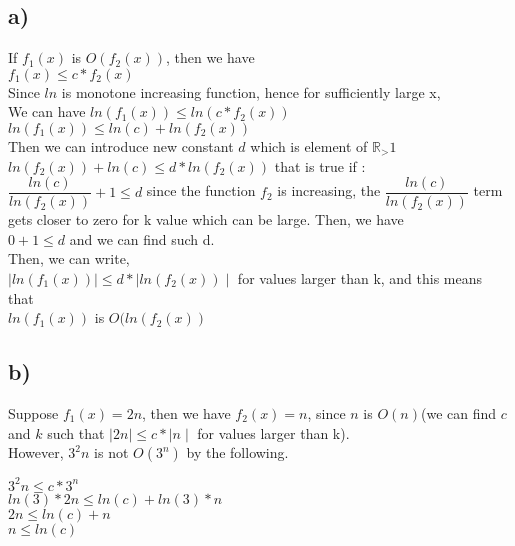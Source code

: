 \documentclass[12pt]{article}
\begin{document}
\subsection*{a)}

If $f_1(x)$ is $O(f_2(x))$, then we have \\
$f_1(x) \leq c * f_2(x)$ \\

Since $ln$ is monotone increasing function, hence for sufficiently large x, \\

We can have $ln(f_1(x)) \leq ln(c*f_2(x))$ \\

$ln(f_1(x)) \leq ln(c) + ln(f_2(x))$ \\

Then we can introduce new constant $d$ which is element of $\mathbb{R}_>1$ \\

$ln(f_2(x)) + ln(c) \leq d*ln(f_2(x))$ that is true if : \\

$\dfrac{ln(c)}{ln(f_2(x))} + 1 \leq d$ since the function $f_2$ is increasing, the  $\dfrac{ln(c)}{ln(f_2(x))}$ term gets closer to zero for k value which can be large. Then, we have \\

$0 + 1 \leq d$ and we can find such d. \\

Then, we can write, \\ 
 
$ \mid ln(f_1(x)) \mid \leq d * \mid ln(f_2(x)) \mid$ for values larger than k, and this means that \\

$ln(f_1(x))$ is $O(ln(f_2(x))$


\subsection*{b)}

Suppose $f_1(x) = 2n$, then  we have $f_2(x) = n$, since $n$ is $O(n)$(we can find $c$ and $k$ such that $\mid 2n \mid \leq c * \mid n \mid$ for values larger than k). \\

However, $3^2n$ is not  $O(3^n)$ by the following. 

$3^2n \leq c * 3^n$ \\
$ln(3)* 2n \leq ln(c) + ln(3) * n$ \\
$2n \leq ln(c) + n$ \\ 
$n \leq ln(c)$
\end{document}
